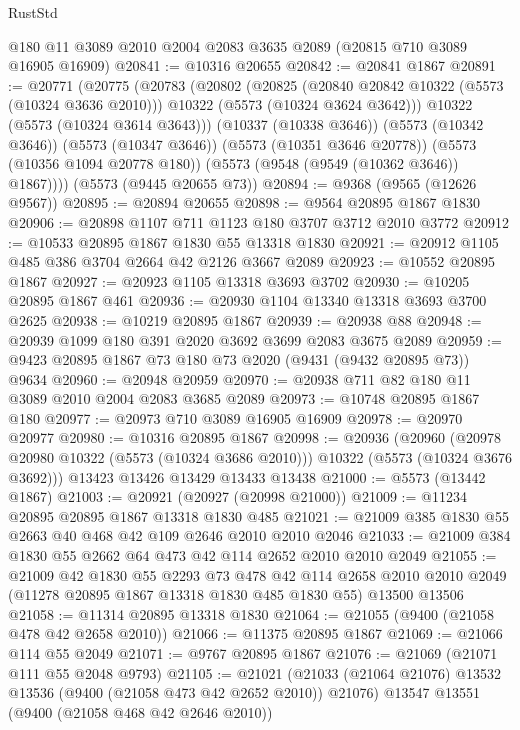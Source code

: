 \begin{lexlean}{RustStd}
\begin{coremodule}
    @180
    @11
    @3089
    @2010
    @2004
    @2083
    @3635
    @2089
    (@20815 @710 @3089 @16905 @16909)
@20841 := @10316 @20655
@20842 := @20841 @1867
@20891 := @20771
    (@20775
      (@20783
        (@20802
          (@20825
            (@20840 @20842 @10322 (@5573 (@10324 @3636 @2010)))
            @10322
            (@5573 (@10324 @3624 @3642)))
          @10322
          (@5573 (@10324 @3614 @3643)))
        (@10337 (@10338 @3646))
        (@5573 (@10342 @3646))
        (@5573 (@10347 @3646))
        (@5573 (@10351 @3646 @20778))
        (@5573 (@10356 @1094 @20778 @180))
        (@5573 (@9548 (@9549 (@10362 @3646)) @1867))))
    (@5573 (@9445 @20655 @73))
@20894 := @9368 (@9565 (@12626 @9567))
@20895 := @20894 @20655
@20898 := @9564 @20895 @1867 @1830
@20906 := @20898 @1107 @711 @1123 @180 @3707 @3712 @2010 @3772
@20912 := @10533 @20895 @1867 @1830 @55 @13318 @1830
@20921 := @20912 @1105 @485 @386 @3704 @2664 @42 @2126 @3667 @2089
@20923 := @10552 @20895 @1867
@20927 := @20923 @1105 @13318 @3693 @3702
@20930 := @10205 @20895 @1867 @461
@20936 := @20930 @1104 @13340 @13318 @3693 @3700 @2625
@20938 := @10219 @20895 @1867
@20939 := @20938 @88
@20948 := @20939 @1099 @180 @391 @2020 @3692 @3699 @2083 @3675 @2089
@20959 := @9423 @20895 @1867 @73 @180 @73 @2020 (@9431 (@9432 @20895 @73)) @9634
@20960 := @20948 @20959
@20970 := @20938 @711 @82 @180 @11 @3089 @2010 @2004 @2083 @3685 @2089
@20973 := @10748 @20895 @1867 @180
@20977 := @20973 @710 @3089 @16905 @16909
@20978 := @20970 @20977
@20980 := @10316 @20895 @1867
@20998 := @20936
    (@20960 (@20978 @20980 @10322 (@5573 (@10324 @3686 @2010))) @10322 (@5573 (@10324 @3676 @3692)))
    @13423
    @13426
    @13429
    @13433
    @13438
@21000 := @5573 (@13442 @1867)
@21003 := @20921 (@20927 (@20998 @21000))
@21009 := @11234 @20895 @20895 @1867 @13318 @1830 @485
@21021 := @21009 @385 @1830 @55 @2663 @40 @468 @42 @109 @2646 @2010 @2010 @2046
@21033 := @21009 @384 @1830 @55 @2662 @64 @473 @42 @114 @2652 @2010 @2010 @2049
@21055 := @21009
    @42
    @1830
    @55
    @2293
    @73
    @478
    @42
    @114
    @2658
    @2010
    @2010
    @2049
    (@11278 @20895 @1867 @13318 @1830 @485 @1830 @55)
    @13500
    @13506
@21058 := @11314 @20895 @13318 @1830
@21064 := @21055 (@9400 (@21058 @478 @42 @2658 @2010))
@21066 := @11375 @20895 @1867
@21069 := @21066 @114 @55 @2049
@21071 := @9767 @20895 @1867
@21076 := @21069 (@21071 @111 @55 @2048 @9793)
@21105 := @21021
    (@21033 (@21064 @21076) @13532 @13536 (@9400 (@21058 @473 @42 @2652 @2010)) @21076)
    @13547
    @13551
    (@9400 (@21058 @468 @42 @2646 @2010))

\end{coremodule}
\end{lexlean}
